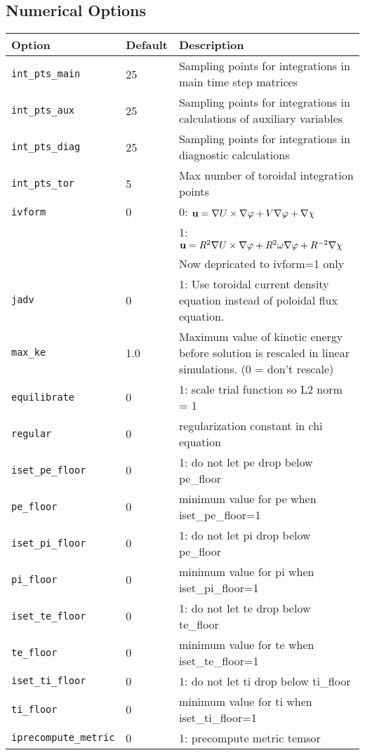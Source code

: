 \subsection{Numerical Options}
\begin{tabular}{llp{4in}}
  \textbf{Option}&\textbf{Default}&\textbf{Description}\\
  \hline
 \texttt{int\_pts\_main}  & 25 & Sampling points for integrations in
                                main time step matrices\\
  \texttt{int\_pts\_aux}   & 25 & Sampling points for integrations in
                                calculations of auxiliary variables\\
  \texttt{int\_pts\_diag}  & 25 & Sampling points for integrations in
                                diagnostic calculations\\
  \texttt{int\_pts\_tor}   & 5 & Max number of toroidal integration points \\
  \texttt{ivform} & 0   & 0: $\mathbf{u} = \nabla U\times\nabla \varphi + V
   \nabla \varphi + \nabla \chi$\\
   & & 1: $\mathbf{u} = R^2 \nabla U\times\nabla \varphi + R^2 \omega
   \nabla \varphi + R^{-2} \nabla \chi$\\
   & & Now depricated to ivform=1 only \\
  \texttt{jadv}   & 0   & 1: Use toroidal current density equation
                          instead of poloidal flux equation.\\
  \texttt{max\_ke}& 1.0  & Maximum value of kinetic energy before solution is
                          rescaled in linear simulations. (0 = don't rescale)\\
  \texttt{equilibrate} & 0 & 1: scale trial function so L2 norm = 1 \\
  \texttt{regular}     & 0 & regularization constant in chi equation \\
  \texttt{iset\_pe\_floor} & 0 & 1: do not let pe drop below pe\_floor \\
  \texttt{pe\_floor}       & 0 & minimum value for pe when iset\_pe\_floor=1 \\

 \texttt{iset\_pi\_floor} & 0 & 1: do not let pi drop below pe\_floor \\
  \texttt{pi\_floor}	   & 0 & minimum value for pi when iset\_pi\_floor=1 \\

 \texttt{iset\_te\_floor} & 0 & 1: do not let te drop below te\_floor \\
  \texttt{te\_floor}	   & 0 & minimum value for te when iset\_te\_floor=1 \\

 \texttt{iset\_ti\_floor} & 0 & 1: do not let ti drop below ti\_floor \\
  \texttt{ti\_floor}	   & 0 & minimum value for ti when iset\_ti\_floor=1 \\






  \texttt{iprecompute\_metric} & 0 & 1: precompute metric temsor
\end{tabular}


